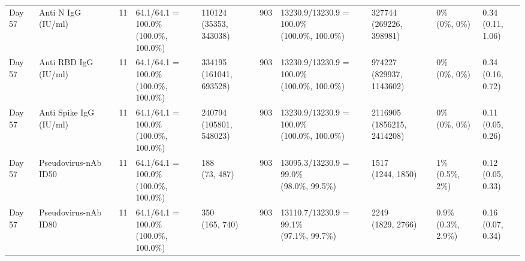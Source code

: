 \documentclass[]{book}
\theoremstyle{definition}
\theoremstyle{definition}
\theoremstyle{definition}
\newcommand{\1}{\mathbbm{1}}
\begin{document}
\begin{landscape}
\begin{ThreePartTable}
\begin{longtable}[t]{>{\raggedright\arraybackslash}p{1cm}lllllllll}
\addlinespace
Day 57 & Anti N IgG (IU/ml) & 11 & \makecell[l]{64.1/64.1 = 100.0\%\\(100.0\%, 100.0\%)} & \makecell[l]{110124\\(35353, 343038)} & 903 & \makecell[l]{13230.9/13230.9 = 100.0\%\\(100.0\%, 100.0\%)} & \makecell[l]{327744\\(269226, 398981)} & \makecell[l]{0\%\\(0\%, 0\%)} & \makecell[l]{0.34\\(0.11, 1.06)}\\
Day 57 & Anti RBD IgG (IU/ml) & 11 & \makecell[l]{64.1/64.1 = 100.0\%\\(100.0\%, 100.0\%)} & \makecell[l]{334195\\(161041, 693528)} & 903 & \makecell[l]{13230.9/13230.9 = 100.0\%\\(100.0\%, 100.0\%)} & \makecell[l]{974227\\(829937, 1143602)} & \makecell[l]{0\%\\(0\%, 0\%)} & \makecell[l]{0.34\\(0.16, 0.72)}\\
Day 57 & Anti Spike IgG (IU/ml) & 11 & \makecell[l]{64.1/64.1 = 100.0\%\\(100.0\%, 100.0\%)} & \makecell[l]{240794\\(105801, 548023)} & 903 & \makecell[l]{13230.9/13230.9 = 100.0\%\\(100.0\%, 100.0\%)} & \makecell[l]{2116905\\(1856215, 2414208)} & \makecell[l]{0\%\\(0\%, 0\%)} & \makecell[l]{0.11\\(0.05, 0.26)}\\
Day 57 & Pseudovirus-nAb ID50 & 11 & \makecell[l]{64.1/64.1 = 100.0\%\\(100.0\%, 100.0\%)} & \makecell[l]{188\\(73, 487)} & 903 & \makecell[l]{13095.3/13230.9 = 99.0\%\\(98.0\%, 99.5\%)} & \makecell[l]{1517\\(1244, 1850)} & \makecell[l]{1\%\\(0.5\%, 2\%)} & \makecell[l]{0.12\\(0.05, 0.33)}\\
Day 57 & Pseudovirus-nAb ID80 & 11 & \makecell[l]{64.1/64.1 = 100.0\%\\(100.0\%, 100.0\%)} & \makecell[l]{350\\(165, 740)} & 903 & \makecell[l]{13110.7/13230.9 = 99.1\%\\(97.1\%, 99.7\%)} & \makecell[l]{2249\\(1829, 2766)} & \makecell[l]{0.9\%\\(0.3\%, 2.9\%)} & \makecell[l]{0.16\\(0.07, 0.34)}\\*
\end{longtable}
\end{ThreePartTable}



\end{landscape}
\end{document}
